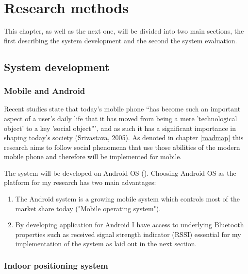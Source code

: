 \section{Research methods}

This chapter, as well as the next one, will be divided into two main sections, the first describing the system development and the second the system evaluation.

\subsection{System development}

\subsubsection{Mobile and Android}


Recent studies state that today's mobile phone ``has become such an important aspect of a user's daily life that it has moved from being a mere 'technological object' to a key 'social object''', and as such it has a significant importance in shaping today's society (Srivastava, 2005). As denoted in chapter \ref{roadmap} this research aims to follow social phenomena that use those abilities of the modern mobile phone and therefore will be implemented for mobile.

The system will be developed on Android OS (). Choosing Android OS as the platform for my research has two main advantages:
\begin{enumerate}
	\item The Android system is a growing mobile system which controls most of the market share today ("Mobile operating system").
	\item By developing application for Android I have access to underlying Bluetooth properties such as received signal strength indicator (RSSI) essential for my implementation of the system as laid out in the next section.
\end{enumerate}

\subsubsection{Indoor positioning system}\label{methods:ips}


